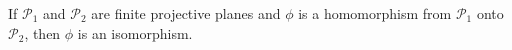 If $\mathcal{P}_1$ and $\mathcal{P}_2$ are finite projective planes and $\phi$ is a homomorphism from $\mathcal{P}_1$ onto $\mathcal{P}_2$, then $\phi$ is an isomorphism.
